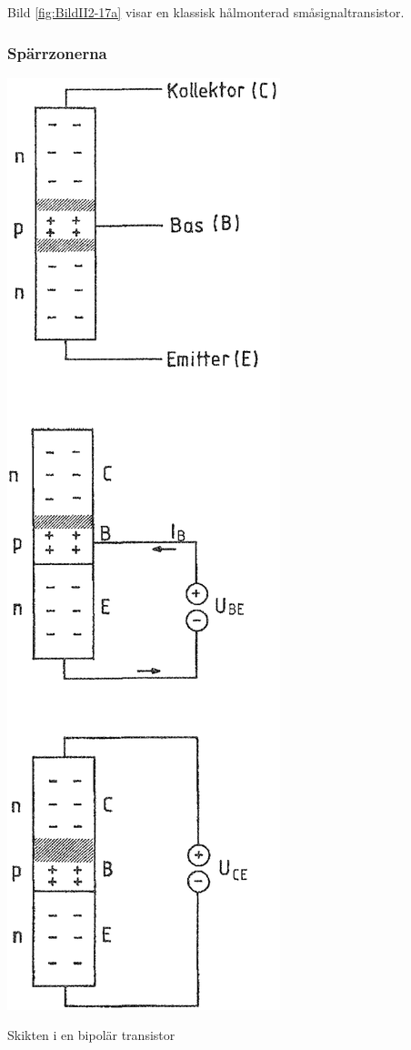 Bild \ref{fig:BildII2-17a} visar en klassisk hålmonterad småsignaltransistor.

\subsubsection{Spärrzonerna}

\begin{marginfigure}
\includegraphics[width=.5\textwidth]{images/cropped_pdfs/bild_2_2-17.pdf}
\caption{Skikten i en bipolär transistor}
\label{fig:BildII2-17}
\end{marginfigure}

